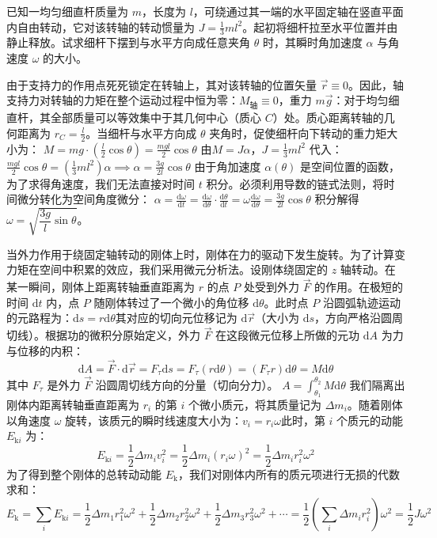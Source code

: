 \begin{exercise}
已知一均匀细直杆质量为 $m$，长度为 $l$，可绕通过其一端的水平固定轴在竖直平面内自由转动，它对该转轴的转动惯量为 $J = \frac{1}{3}ml^2$。起初将细杆拉至水平位置并由静止释放。试求细杆下摆到与水平方向成任意夹角 $\theta$ 时，其瞬时角加速度 $\alpha$ 与角速度 $\omega$ 的大小。
\end{exercise}
\begin{solution}
由于支持力的作用点死死锁定在转轴上，其对该转轴的位置矢量 $\vec{r} \equiv 0$。因此，轴支持力对转轴的力矩在整个运动过程中恒为零：$M_{\text{轴}} \equiv 0$，重力 $m\vec{g}$：对于均匀细直杆，其全部质量可以等效集中于其几何中心（质心 $C$）处。质心距离转轴的几何距离为 $r_C = \frac{l}{2}$。当细杆与水平方向成 $\theta$ 夹角时，促使细杆向下转动的重力矩大小为： \(M = mg \cdot \left(\frac{l}{2}\cos\theta\right) = \frac{mgl}{2}\cos\theta\) 由$M = J\alpha$，$J = \frac{1}{3}ml^2$ 代入： \(\frac{mgl}{2}\cos\theta = \left(\frac{1}{3}ml^2\right) \alpha\implies \alpha = \frac{3g}{2l}\cos\theta\) 由于角加速度 $\alpha(\theta)$ 是空间位置的函数，为了求得角速度，我们无法直接对时间 $t$ 积分。必须利用导数的链式法则，将时间微分转化为空间角度微分： \(\alpha = \frac{\mathrm{d}\omega}{\mathrm{d}t} = \frac{\mathrm{d}\omega}{\mathrm{d}\theta} \cdot \frac{\mathrm{d}\theta}{\mathrm{d}t} = \omega\frac{\mathrm{d}\omega}{\mathrm{d}\theta}= \frac{3g}{2l}\cos\theta\) 积分解得$\omega = \sqrt{\dfrac{3g}{l}\sin\theta}$。
\end{solution}

\begin{definition}[力矩做功与元功表达式]
当外力作用于绕固定轴转动的刚体上时，刚体在力的驱动下发生旋转。为了计算变力矩在空间中积累的效应，我们采用微元分析法。设刚体绕固定的 $z$ 轴转动。在某一瞬间，刚体上距离转轴垂直距离为 $r$ 的点 $P$ 处受到外力 $\vec{F}$ 的作用。在极短的时间 $\mathrm{d}t$ 内，点 $P$ 随刚体转过了一个微小的角位移 $\mathrm{d}\theta$。此时点 $P$ 沿圆弧轨迹运动的元路程为：$\mathrm{d}s = r\mathrm{d}\theta$其对应的切向元位移记为 $\mathrm{d}\vec{r}$（大小为 $\mathrm{d}s$，方向严格沿圆周切线）。根据功的微积分原始定义，外力 $\vec{F}$ 在这段微元位移上所做的元功 $\mathrm{d}A$ 为力与位移的内积：$$\mathrm{d}A = \vec{F} \cdot \mathrm{d}\vec{r} = F_\tau \mathrm{d}s=F_\tau (r\mathrm{d}\theta) = (F_\tau r)\mathrm{d}\theta=M\mathrm{d}\theta$$其中 $F_\tau$ 是外力 $\vec{F}$ 沿圆周切线方向的分量（切向分力）。
 \(\boxed{A = \int_{\theta_1}^{\theta_2} M\mathrm{d}\theta}\) 
我们隔离出刚体内距离转轴垂直距离为 $r_i$ 的第 $i$ 个微小质元，将其质量记为 $\Delta m_i$。随着刚体以角速度 $\omega$ 旋转，该质元的瞬时线速度大小为：$v_i = r_i \omega$此时，第 $i$ 个质元的动能 $E_{\text{k}i}$ 为：$$E_{\text{k}i} = \frac{1}{2}\Delta m_i v_i^2 = \frac{1}{2}\Delta m_i (r_i \omega)^2 = \frac{1}{2}\Delta m_i r_i^2 \omega^2$$为了得到整个刚体的总转动动能 $E_{\text{k}}$，我们对刚体内所有的质元项进行无损的代数求和：$$E_{\text{k}} = \sum_i E_{\text{k}i} =\frac{1}{2}\Delta m_1 r_1^2 \omega^2 + \frac{1}{2}\Delta m_2 r_2^2 \omega^2 + \frac{1}{2}\Delta m_3 r_3^2 \omega^2 + \cdots =\frac{1}{2}\left( \sum_i \Delta m_i r_i^2 \right) \omega^2=\frac{1}{2}J\omega^2$$
\end{definition}

